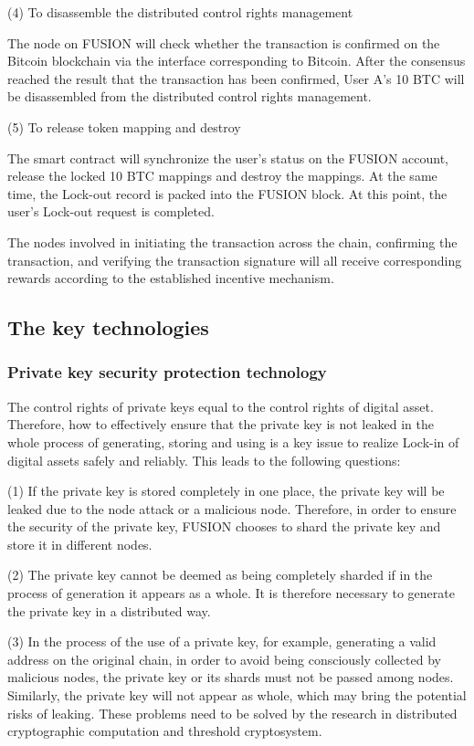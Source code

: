 \documentclass[a4paper,12pt]{article}
\begin{document}
(4) To disassemble the distributed control rights management

The node on FUSION will check whether the transaction is confirmed on the Bitcoin blockchain via the interface corresponding to Bitcoin. After the consensus reached the result that the transaction has been confirmed, User A's 10 BTC will be disassembled from the distributed control rights management.

(5) To release token mapping and destroy

The smart contract will synchronize the user's status on the FUSION account, release the locked 10 BTC mappings and destroy the mappings. At the same time, the Lock-out record is packed into the FUSION block. At this point, the user's Lock-out request is completed.

The nodes involved in initiating the transaction across the chain, confirming the transaction, and verifying the transaction signature will all receive corresponding rewards according to the established incentive mechanism.



\subsection{The key technologies}

\subsubsection{Private key security protection technology}

The control rights of private keys equal to the control rights of digital asset. Therefore, how to effectively ensure that the private key is not leaked in the whole process of generating, storing and using is a key issue to realize Lock-in of digital assets safely and reliably. This leads to the following questions:

(1) If the private key is stored completely in one place, the private key will be leaked due to the node attack or a malicious node. Therefore, in order to ensure the security of the private key, FUSION chooses to shard the private key and store it in different nodes.

(2) The private key cannot be deemed as being completely sharded if in the process of generation it appears as a whole.  It is therefore necessary to generate the private key in a distributed way.

(3) In the process of the use of a private key, for example, generating a valid address on the original chain, in order to avoid being consciously collected by malicious nodes, the private key or its shards must not be passed among nodes. Similarly, the private key will not appear as whole, which may bring the potential risks of leaking. These problems need to be solved by the research in distributed cryptographic computation and threshold cryptosystem.
\end{document}

